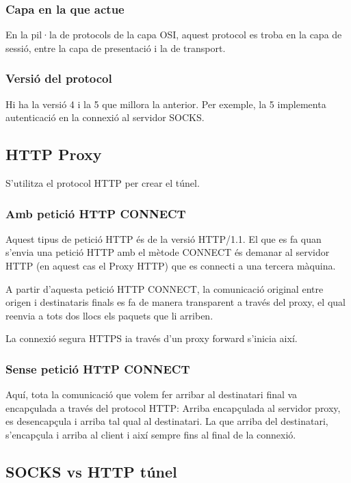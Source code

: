 \documentclass[a4paper]{article}
\begin{document}
\subsubsection{Capa en la que actue}

En la pil·la de protocols de la capa OSI, aquest protocol es troba en la capa de sessió, entre la capa de presentació i la de transport.

\subsubsection{Versió del protocol}

Hi ha la versió 4 i la 5 que millora la anterior. Per exemple, la 5 implementa autenticació en la connexió al servidor SOCKS.

\subsection{HTTP Proxy}

S'utilitza el protocol HTTP per crear el túnel.

\subsubsection{Amb petició HTTP CONNECT}

Aquest tipus de petició HTTP \'es de la versió HTTP/1.1. El que es fa quan s'envia una petició HTTP amb el mètode CONNECT \'es demanar al servidor HTTP (en aquest cas el Proxy HTTP) que es connecti a una tercera màquina. 

A partir d'aquesta petició HTTP CONNECT, la comunicació original entre origen i destinataris finals es fa de manera transparent a trav\'es del proxy, el qual reenvia a tots dos llocs els paquets que li arriben.

La connexió segura HTTPS ia trav\'es d'un proxy forward s'inicia així.

\subsubsection{Sense petició HTTP CONNECT}

Aquí, tota la comunicació que volem fer arribar al destinatari final va encapçulada a trav\'es del protocol HTTP: Arriba encapçulada al servidor proxy, es desencapçula i arriba tal qual al destinatari. La que arriba del destinatari, s'encapçula i arriba al client i així sempre fins al final de la connexió.

\subsection{SOCKS vs HTTP túnel}
\end{document}
